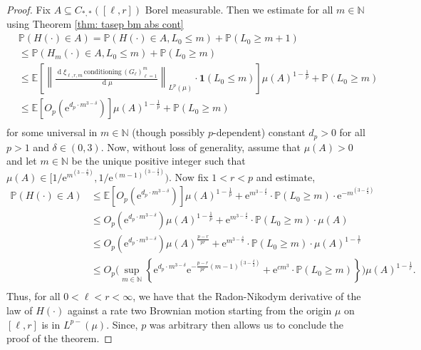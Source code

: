 \documentclass[11pt, reqno]{amsart}
\numberwithin{equation}{section}
\newcommand{\N}{\ensuremath{\mathbb{N}}}
\newcommand{\PP}{\ensuremath{\mathbb{P}}}
\newcommand{\norm}[1]{\left\lVert#1\right\rVert}
\newcommand{\diff}{\ensuremath{\operatorname{d}\!}}
\begin{document}
\begin{proof}
Fix $A\subseteq C_{*,*}([\ell,r])$ Borel measurable. Then we estimate for all $m\in \N$ using Theorem \ref{thm: tasep bm abs cont}
\begin{equation*}
\begin{array}{cc}
     &\PP(H(\cdot)\in A)= \PP(H(\cdot)\in A, L_0\le m) + \PP(L_0\geq m+1) \\
     & \le \PP(H_m(\cdot)\in A, L_0\le m) + \PP(L_0\geq m)\\
     & \le \mathbb{E}\left[\norm{\frac{\diff \xi_{\ell, r, m} \,\mathrm{conditioning}\, (G_\ell)^m_{\ell=1}}{\diff\mu}}_{L^p(\mu)}\cdot \mathbf{1}(L_0\le m)\right]\mu(A)^{1-\frac{1}{p}} + \PP(L_0\geq m)\\
     & \le \mathbb{E}\left[ O_p(\mathrm{e}^{d_p \cdot  m^{3-\delta}})\right]\mu(A)^{1-\frac{1}{p}} + \PP(L_0\geq m)\\
\end{array}
\end{equation*}
for some universal in $m\in \N$ (though possibly $p$-dependent) constant $d_p>0$ for all $p>1$ and $\delta\in (0,3)$. Now, without loss of generality, assume that $\mu(A)>0$ and let $m\in \N$ be the unique positive integer such that $\mu(A)\in [1/\mathrm{e}^{m^{(3-\frac{\delta}{2})}}, 1/\mathrm{e}^{(m-1)^{(3-\frac{\delta}{2})}})$. Now fix $1<r<p$ and estimate, 
\begin{equation*}
    \begin{array}{cc}
     \PP(H(\cdot)\in A)&\le \mathbb{E}\left[ O_p(\mathrm{e}^{d_p \cdot  m^{3-\delta}})\right]\mu(A)^{1-\frac{1}{p}} + \mathrm{e}^{m^{3-\frac{\delta}{2}}}\cdot \PP(L_0\geq m)\cdot \mathrm{e}^{-m^{(3-\frac{\delta}{2})}} \\
     &\le  O_p(\mathrm{e}^{d_p \cdot  m^{3-\delta}})\mu(A)^{1-\frac{1}{p}} + \mathrm{e}^{m^{3-\frac{\delta}{2}}}\cdot \PP(L_0\geq m)\cdot \mu(A)\\
     &\le  O_p(\mathrm{e}^{d_p \cdot  m^{3-\delta}})\mu(A)^{\frac{p-r}{pr}} + \mathrm{e}^{m^{3-\frac{\delta}{2}}}\cdot \PP(L_0\geq m)\cdot \mu(A)^{1-\frac{1}{r}}\\
     &\le  O_p\Bigg(\displaystyle\sup_{m\in \N}\left\{\mathrm{e}^{d_p \cdot  m^{3-\delta}}\mathrm{e}^{-\frac{p-r}{pr}(m-1)^{(3-\frac{\delta}{2})}}+\mathrm{e}^{cm^3}\cdot \PP(L_0\geq m)\right\}\Bigg)\mu(A)^{1-\frac{1}{r}}\tag{*}.\\
\end{array}
\end{equation*}
Thus, for all $0<\ell<r<\infty$, we have that the Radon-Nikodym  derivative of the law of $H(\cdot)$ against a rate two Brownian motion starting from the origin $\mu$ on $[\ell,r]$ is in $L^{p-}(\mu)$. Since, $p$ was arbitrary then allows us to conclude the proof of the theorem.
\end{proof}
\end{document}
